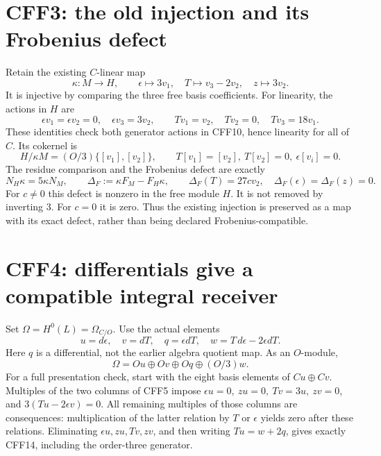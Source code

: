 \section{CFF3: the old injection and its Frobenius defect}
Retain the existing \(C\)-linear map
\[
 \kappa:M\longrightarrow H,\qquad
 \epsilon\longmapsto3v_1,\quad
 T\longmapsto v_3-2v_2,\quad z\longmapsto3v_2.
 \tag{CFF10}
\]
It is injective by comparing the three free basis coefficients.
For linearity, the actions in \(H\) are
\[
 \epsilon v_1=\epsilon v_2=0,\quad \epsilon v_3=3v_2,\qquad
 Tv_1=v_2,\quad Tv_2=0,\quad Tv_3=18v_1.
\]
These identities check both generator actions in CFF10, hence
linearity for all of \(C\). Its cokernel is
\[
 H/\kappa M=(O/3)\{[v_1],[v_2]\},\qquad T[v_1]=[v_2],\
 T[v_2]=0,\ \epsilon[v_i]=0.
 \tag{CFF11}
\]
The residue comparison and the Frobenius defect are exactly
\[
 N_H\kappa=5\kappa N_M,\qquad
 \Delta_F:=\kappa F_M-F_H\kappa,\qquad
 \Delta_F(T)=27cv_2,\quad \Delta_F(\epsilon)=\Delta_F(z)=0.
 \tag{CFF12}
\]
For \(c\ne0\) this defect is nonzero in the free module \(H\).
It is not removed by inverting 3. For \(c=0\) it is zero.
Thus the existing injection is preserved as a map with its exact
defect, rather than being declared Frobenius-compatible.

\section{CFF4: differentials give a compatible integral receiver}
Set \(\Omega=H^0(L)=\Omega_{C/O}\). Use the actual elements
\[
 u=d\epsilon,\quad v=dT,\quad q=\epsilon dT,\quad
 w=T\,d\epsilon-2\epsilon dT .
 \tag{CFF13}
\]
Here \(q\) is a differential, not the earlier algebra quotient map.
As an \(O\)-module,
\[
 \Omega=Ou\oplus Ov\oplus Oq\oplus(O/3)w .
 \tag{CFF14}
\]
For a full presentation check, start with the eight basis elements
of \(C u\oplus C v\). Multiples of the two columns of CFF5 impose
\(\epsilon u=0,\ z u=0,\ Tv=3u,\ zv=0\), and
\(3(Tu-2\epsilon v)=0\). All remaining multiples of those columns
are consequences: multiplication of the latter relation by \(T\)
or \(\epsilon\) yields zero after these relations. Eliminating
\(\epsilon u,zu,Tv,zv\), and then writing \(Tu=w+2q\), gives
exactly CFF14, including the order-three generator.

